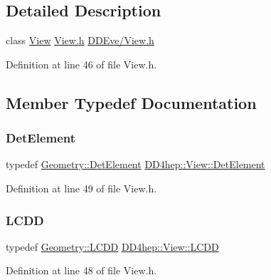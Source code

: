 \subsection{Detailed Description}
class \hyperlink{class_d_d4hep_1_1_view}{View} \hyperlink{_view_8h}{View.\+h} \hyperlink{_view_8h}{D\+D\+Eve/\+View.\+h} 

Definition at line 46 of file View.\+h.



\subsection{Member Typedef Documentation}
\hypertarget{class_d_d4hep_1_1_view_a59eafc8150df21b918b964850ac6c462}{}\label{class_d_d4hep_1_1_view_a59eafc8150df21b918b964850ac6c462} 
\subsubsection{\texorpdfstring{Det\+Element}{DetElement}}
{\footnotesize\ttfamily typedef \hyperlink{class_d_d4hep_1_1_geometry_1_1_det_element}{Geometry\+::\+Det\+Element} \hyperlink{class_d_d4hep_1_1_view_a59eafc8150df21b918b964850ac6c462}{D\+D4hep\+::\+View\+::\+Det\+Element}}



Definition at line 49 of file View.\+h.

\hypertarget{class_d_d4hep_1_1_view_ac08032a73da302ae36cd3c7b07b83864}{}\label{class_d_d4hep_1_1_view_ac08032a73da302ae36cd3c7b07b83864} 
\subsubsection{\texorpdfstring{L\+C\+DD}{LCDD}}
{\footnotesize\ttfamily typedef \hyperlink{class_d_d4hep_1_1_geometry_1_1_l_c_d_d}{Geometry\+::\+L\+C\+DD} \hyperlink{class_d_d4hep_1_1_view_ac08032a73da302ae36cd3c7b07b83864}{D\+D4hep\+::\+View\+::\+L\+C\+DD}}



Definition at line 48 of file View.\+h.

\hypertarget{class_d_d4hep_1_1_view_ad8426310f6488c879c008001eb20289e}{}\label{class_d_d4hep_1_1_view_ad8426310f6488c879c008001eb20289e} 
